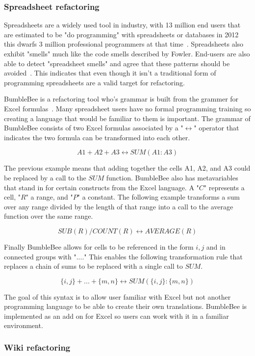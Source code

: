 \subsubsection{Spreadsheet refactoring}
Spreadsheets are a widely used tool in industry, with 13 million end users that are estimated to be "do programming" with spreadsheets or databases in 2012 this dwarfs 3 million professional programmers at that time~\citep{endUsers}. Spreadsheets also exhibit "smells" much like the code smells described by Fowler. End-users are also able to detect "spreadsheet smells" and agree that these patterns should be avoided~\citep{spreadsheetSmells}. This indicates that even though it isn't a traditional form of programming spreadsheets are a valid target for refactoring.

BumbleBee is a refactoring tool who's grammar is built from the grammer for Excel formulas~\citep{bumblebee}. Many spreadsheet users have no formal programming training so creating a language that would be familiar to them is important. The grammar of BumbleBee consists of two Excel formulas associated by a "$\leftrightarrow$" operator that indicates the two formula can be transformed into each other.

$$ A1+A2+A3 \leftrightarrow SUM(A1:A3) $$

The previous example means that adding together the cells A1, A2, and A3 could be replaced by a call to the $SUM$ function. BumbleBee also has metavariables that stand in for certain constructs from the Excel language. A "$C$" represents a cell, "$R$" a range, and "$P$" a constant. The following example transforms a sum over any range divided by the length of that range into a call to the average function over the same range.

$$ SUB(R)/COUNT(R) \leftrightarrow AVERAGE(R) $$

Finally BumbleBee allows for cells to be referenced in the form ${i,j}$ and in connected groups with "$...$." This enables the following transformation rule that replaces a chain of sums to be replaced with a single call to $SUM$.

$$ \{i,j\} + ... + \{m,n\} \leftrightarrow SUM(\{i,j\}:\{m,n\}) $$

The goal of this syntax is to allow user familiar with Excel but not another programming language to be able to create their own translations. BumbleBee is implemented as an add on for Excel so users can work with it in a familiar environment.

\subsubsection{Wiki refactoring}


